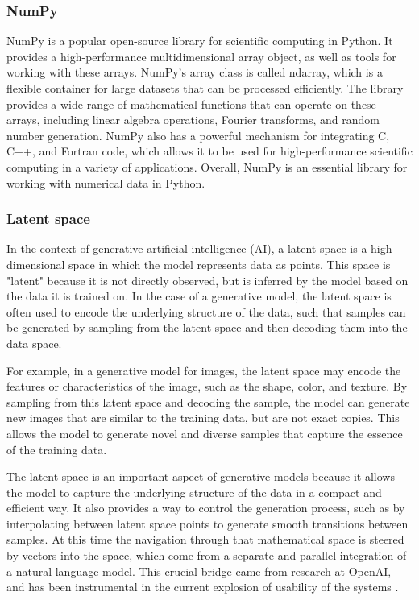 \subsubsection{NumPy}
NumPy is a popular open-source library for scientific computing in Python. It provides a high-performance multidimensional array object, as well as tools for working with these arrays. NumPy's array class is called ndarray, which is a flexible container for large datasets that can be processed efficiently. The library provides a wide range of mathematical functions that can operate on these arrays, including linear algebra operations, Fourier transforms, and random number generation. NumPy also has a powerful mechanism for integrating C, C++, and Fortran code, which allows it to be used for high-performance scientific computing in a variety of applications. Overall, NumPy is an essential library for working with numerical data in Python.
\subsubsection{Latent space}
In the context of generative artificial intelligence (AI), a latent space is a high-dimensional space in which the model represents data as points. This space is "latent" because it is not directly observed, but is inferred by the model based on the data it is trained on. In the case of a generative model, the latent space is often used to encode the underlying structure of the data, such that samples can be generated by sampling from the latent space and then decoding them into the data space.

For example, in a generative model for images, the latent space may encode the features or characteristics of the image, such as the shape, color, and texture. By sampling from this latent space and decoding the sample, the model can generate new images that are similar to the training data, but are not exact copies. This allows the model to generate novel and diverse samples that capture the essence of the training data.

The latent space is an important aspect of generative models because it allows the model to capture the underlying structure of the data in a compact and efficient way. It also provides a way to control the generation process, such as by interpolating between latent space points to generate smooth transitions between samples. At this time the navigation through that mathematical space is steered by vectors into the space, which come from a separate and parallel integration of a natural language model. This crucial bridge came from research at OpenAI, and has been instrumental in the current explosion of usability of the systems \cite{radford2021learning}.
